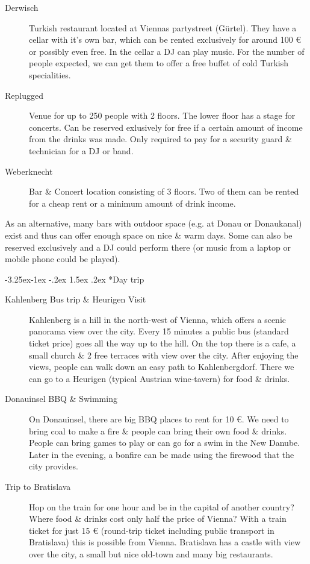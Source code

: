 \documentclass[10pt,a4paper]{article}
\makeatletter
\renewcommand\subsection{%
\@startsection{subsection}{2}{\z@}%
              {-3.25ex\@plus -1ex \@minus -.2ex}%
              {1.5ex \@plus .2ex}%
              {\color{kdelight}\sffamily\Large\bfseries}}
\makeatother
\begin{document}
\begin{description}
\item[\color{kdedarker} Derwisch] Turkish restaurant located at Viennas partystreet (Gürtel). They have a cellar with it's own bar, which can be rented exclusively for around 100 \euro{} or possibly even free. In the cellar a DJ can play music. For the number of people expected, we can get them to offer a free buffet of cold Turkish specialities.
\item[\color{kdedarker} Replugged] Venue for up to 250 people with 2 floors. The lower floor has a stage for concerts. Can be reserved exlusively for free if a certain amount of income from the drinks was made. Only required to pay for a security guard \& technician for a DJ or band.
\item[\color{kdedarker} Weberknecht] Bar \& Concert location consisting of 3 floors. Two of them can be rented for a cheap rent or a minimum amount of drink income.
\end{description}

As an alternative, many bars with outdoor space (e.g. at Donau or Donaukanal) exist and thus can offer enough space on nice \& warm days. Some can also be reserved exclusively and a DJ could perform there (or music from a laptop or mobile phone could be played).


\subsection*{Day trip}
\begin{description}
\item[\color{kdedarker} Kahlenberg Bus trip \& Heurigen Visit] Kahlenberg is a hill in the north-west of Vienna, which offers a scenic panorama view over the city. Every 15 minutes a public bus (standard ticket price) goes all the way up to the hill. On the top there is a cafe, a small church \& 2 free terraces with view over the city. After enjoying the views, people can walk down an easy path to Kahlenbergdorf. There we can go to a Heurigen (typical Austrian wine-tavern) for food \& drinks.
\item[\color{kdedarker} Donauinsel BBQ \& Swimming] On Donauinsel, there are big BBQ places to rent for 10 \euro{}. We need to bring coal to make a fire \& people can bring their own food \& drinks. People can bring games to play or can go for a swim in the New Danube. Later in the evening, a bonfire can be made using the firewood that the city provides.
\item[\color{kdedarker} Trip to Bratislava] Hop on the train for one hour and be in the capital of another country? Where food \& drinks cost only half the price of Vienna? With a train ticket for just 15 \euro{} (round-trip ticket including public transport in Bratislava) this is possible from Vienna. Bratislava has a castle with view over the city, a small but nice old-town and many big restaurants.
\end{description}
\end{document}
